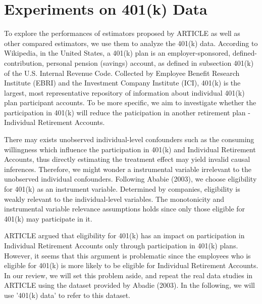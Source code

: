 \documentclass{article}
\begin{document}
\section{Experiments on 401(k) Data}
To explore the performances of estimators proposed by ARTICLE as well as other compared estimators, we use them to analyze the 401(k) data. According to Wikipedia, in the United States, a 401(k) plan is an employer-sponsored, defined-contribution, personal pension (savings) account, as defined in subsection 401(k) of the U.S. Internal Revenue Code. Collected by Employee Benefit Research Institute (EBRI) and the Investment Company Institute (ICI), 401(k) is the largest, most representative repository of information about individual 401(k) plan participant accounts. To be more specific, we aim to investigate whether the participation in 401(k) will reduce the paticipation in another retirement plan - Individual Retirement Accounts. 

There may exists unobserved individual-level confounders such as the consuming willingness which influence the participation in 401(k) and Individual Retirement Accounts, thus directly estimating the treatment effect may yield invalid causal inferences. Therefore, we might wonder a instrumental variable irrelevant to the unobserved individual confounders. Following Ababie (2003), we choose eligibility for 401(k) as an instrument variable. Determined by companies, eligibility is weakly relevant to the individual-level variables. The monotonicity and instrumental variable relevance assumptions holds since only those eligible for 401(k) may participate in it.

ARTICLE argued that eligibility for 401(k) has an impact on participation in Individual Retirement Accounts only through participation in 401(k) plans. However, it seems that this argument is problematic since the employees who is eligible for 401(k) is more likely to be eligible for Individual Retirement Accounts. In our review, we will set this problem aside, and repeat the real data studies in ARTICLE using the dataset provided by Abadie (2003). In the following, we will use '401(k) data' to refer to this dataset.
\end{document}
